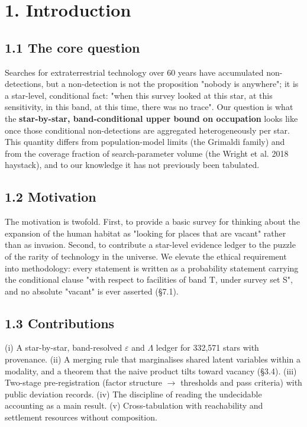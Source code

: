 \documentclass[11pt]{article}
\begin{document}
\section*{1. Introduction}

\subsection*{1.1 The core question}
\noindent Searches for extraterrestrial technology over 60 years have accumulated non-detections, but a non-detection is not the proposition "nobody is anywhere"; it is a star-level, conditional fact: "when this survey looked at this star, at this sensitivity, in this band, at this time, there was no trace". Our question is what the \textbf{star-by-star, band-conditional upper bound on occupation} looks like once those conditional non-detections are aggregated heterogeneously per star. This quantity differs from population-model limits (the Grimaldi family) and from the coverage fraction of search-parameter volume (the Wright et al. 2018 haystack), and to our knowledge it has not previously been tabulated.\par\smallskip

\subsection*{1.2 Motivation}
\noindent The motivation is twofold. First, to provide a basic survey for thinking about the expansion of the human habitat as "looking for places that are vacant" rather than as invasion. Second, to contribute a star-level evidence ledger to the puzzle of the rarity of technology in the universe. We elevate the ethical requirement into methodology: every statement is written as a probability statement carrying the conditional clause "with respect to facilities of band T, under survey set S", and no absolute "vacant" is ever asserted (\S{}7.1).\par\smallskip

\subsection*{1.3 Contributions}
\noindent (i) A star-by-star, band-resolved \(\varepsilon\) and \(\Lambda\) ledger for 332,571 stars with provenance. (ii) A merging rule that marginalises shared latent variables within a modality, and a theorem that the naive product tilts toward vacancy (\S{}3.4). (iii) Two-stage pre-registration (factor structure \(\rightarrow\) thresholds and pass criteria) with public deviation records. (iv) The discipline of reading the undecidable accounting as a main result. (v) Cross-tabulation with reachability and settlement resources without composition.\par\smallskip
\end{document}
